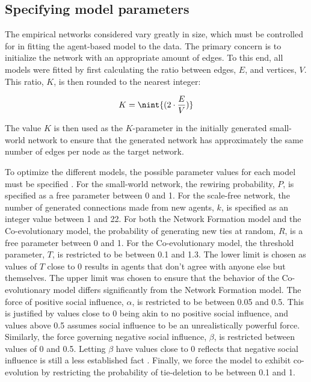 \documentclass[11pt]{article}
\DeclarePairedDelimiter{\nint}\lfloor\rceil
\begin{document}
\subsection{Specifying model parameters}
The empirical networks considered vary greatly in size, which must be controlled for in fitting the agent-based model to the data. The primary concern is to initialize the network with an appropriate amount of edges. To this end, all models were fitted by first calculating the ratio between edges, $E$, and vertices, $V$. This ratio, $K$, is then rounded to the nearest integer: 

$$K = \nint{(2 \cdot \frac{E}{V})}$$

The value $K$ is then used as the $K$-parameter in the initially generated small-world network to ensure that the generated network has approximately the same number of edges per node as the target network. 

\noindent To optimize the different models, the possible parameter values for each model must be specified \cite{akiba_optuna_2019}. For the small-world network, the rewiring probability, $P$, is specified as a free parameter between 0 and 1. For the scale-free network, the number of generated connections made from new agents, $k$, is specified as an integer value between 1 and 22. For both the Network Formation model and the Co-evolutionary model, the probability of generating new ties at random, $R$, is a free parameter between 0 and 1. For the Co-evolutionary model, the threshold parameter, $T$, is restricted to be between 0.1 and 1.3. The lower limit is chosen as values of $T$ close to 0 results in agents that don’t agree with anyone else but themselves. The upper limit was chosen to ensure that the behavior of the Co-evolutionary model differs significantly from the Network Formation model. 
The force of positive social influence, $\alpha$, is restricted to be between 0.05 and 0.5. This is justified by values close to 0 being akin to no positive social influence, and values above 0.5 assumes social influence to be an unrealistically powerful force. Similarly, the force governing negative social influence, $\beta$, is restricted between values of 0 and 0.5. Letting $\beta$ have values close to 0 reflects that negative social influence is still a less established fact \cite{takacs_is_2014, turner_paths_2018}. Finally, we force the model to exhibit co-evolution by restricting the probability of tie-deletion to be between 0.1 and 1. 
\end{document}
